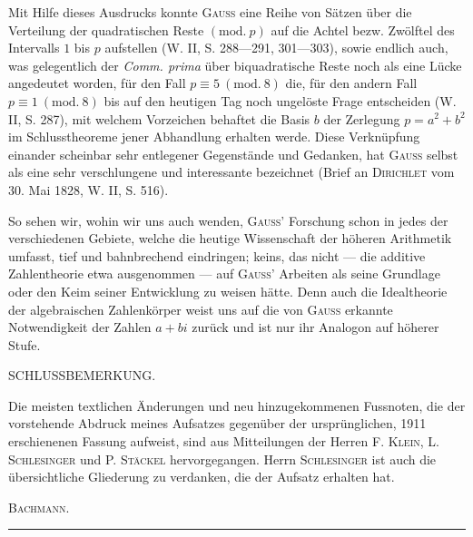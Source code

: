 Mit Hilfe dieses Ausdrucks konnte \textsc{Gauss} eine Reihe von Sätzen über die
\newpage{}
\noindent Verteilung der quadratischen Reste \((\mathrm{mod.}\ p)\) auf die Achtel bezw. Zwölftel des Intervalls \(1\) bis \(p\) aufstellen (W. II, S. 288—291, 301—303), sowie endlich auch, was gelegentlich der \textit{Comm. prima} über biquadratische Reste noch als eine Lücke angedeutet worden, für den Fall \(p\equiv5\ (\mathrm{mod.}\ 8)\) die, für den andern Fall \(p\equiv1\ (\mathrm{mod.}\ 8)\) bis auf den heutigen Tag noch ungelöste Frage entscheiden (W. II, S. 287), mit welchem Vorzeichen behaftet die Basis \(b\) der Zerlegung \(p=a^2+b^2\) im Schlusstheoreme jener Abhandlung erhalten werde. Diese Verknüpfung einander scheinbar sehr entlegener Gegenstände und Gedanken, hat \textsc{Gauss} selbst als eine sehr verschlungene und interessante bezeichnet (Brief an \textsc{Dirichlet} vom 30. Mai 1828, W. II, S. 516).

\bigskip
So sehen wir, wohin wir uns auch wenden, \textsc{Gauss}’ Forschung schon in jedes der verschiedenen Gebiete, welche die heutige Wissenschaft der höheren Arithmetik umfasst, tief und bahnbrechend eindringen; keins, das nicht — die additive Zahlentheorie etwa ausgenommen — auf \textsc{Gauss}’ Arbeiten als seine Grundlage oder den Keim seiner Entwicklung zu weisen hätte. Denn auch die Idealtheorie der algebraischen Zahlenkörper weist uns auf die von \textsc{Gauss} erkannte Notwendigkeit der Zahlen \(a+bi\) zurück und ist nur ihr Analogon auf höherer Stufe.

\begin{center}\small SCHLUSSBEMERKUNG.\end{center}
\begingroup\small
\noindent\hspace*{\parindent}Die meisten textlichen Änderungen und neu hinzugekommenen Fussnoten, die der vorstehende Abdruck meines Aufsatzes gegenüber der ursprünglichen, 1911 erschienenen Fassung aufweist, sind aus Mitteilungen der Herren \textsc{F. Klein}, \textsc{L. Schlesinger} und \textsc{P. Stäckel} hervorgegangen. Herrn \textsc{Schlesinger} ist auch die übersichtliche Gliederung zu verdanken, die der Aufsatz erhalten hat.
\begin{flushright}\textsc{Bachmann.}\end{flushright}
\endgroup
\begin{center}\rule{.24\textwidth}{.3pt}\end{center}
